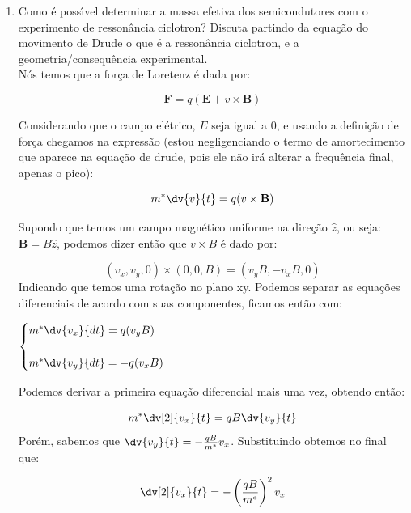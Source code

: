 
\begin{enumerate}
  \item Como é possı́vel determinar a massa efetiva dos semicondutores com o experimento de ressonância ciclotron? Discuta partindo da equação do movimento de Drude o que é a ressonância ciclotron, e a geometria/consequência experimental.\\

    Nós temos que a força de Loretenz é dada por:

    \begin{equation}
         \mathbf{F} = q(\mathbf{E} + v \times \mathbf{B}) 
    \end{equation}

    Considerando que o campo elétrico, $E$ seja igual a $0$, e usando a definição de força chegamos na expressão (estou negligenciando o termo de amortecimento que aparece na equação de drude, pois ele não irá alterar a frequência final, apenas o pico):

    \begin{equation}
        m^*\dv{v}{t} = q(v \times \mathbf{B}) 
    \end{equation}

    Supondo que temos um campo magnético uniforme na direção $\hat{z}$, ou seja: $\mathbf{B} = B\hat{z}$, podemos dizer então que $v \times B$ é dado por:

    $$(v_x, v_y, 0) \times (0, 0, B) = (v_yB, -v_xB, 0)$$
    Indicando que temos uma rotação no plano xy. Podemos separar as equações diferenciais de acordo com suas componentes, ficamos então com:
  \begin{center}
    $\begin{cases}
      m^*\dv{v_x}{dt} = q(v_yB)\\\\
      m^*\dv{v_y}{dt} = -q(v_xB)
    \end{cases}$
  \end{center}
  
  Podemos derivar a primeira equação diferencial mais uma vez, obtendo então:

  $$m^*\dv[2]{v_x}{t} = qB\dv{v_y}{t}$$
  Porém, sabemos que $\dv{v_y}{t} = -\frac{qB}{m^*}v_x$. Substituindo obtemos no final que:

  \begin{equation}
     \dv[2]{v_x}{t} = -\left(\frac{qB}{m^*}\right)^2v_x 
  \end{equation}


\end{enumerate}

